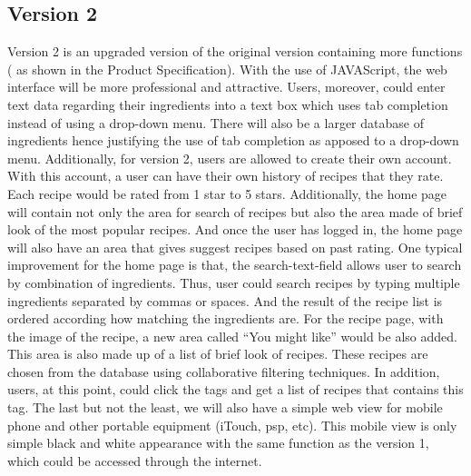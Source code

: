 \documentclass[12pt]{article}
\begin{document}
\subsection{Version 2}
Version 2 is an upgraded version of the original version containing more functions ( as shown in the Product Specification). With the use of JAVAScript, the web interface will be more professional and attractive. Users, moreover, could enter text data regarding their ingredients into a text box which uses tab completion instead of using a drop-down menu. There will also be a larger database of ingredients hence justifying the use of tab completion as apposed to a drop-down menu.
Additionally, for version 2, users are allowed to create their own account. With this account, a user can have their own history of recipes that they rate. Each recipe would be rated from 1 star to 5 stars. Additionally, the home page will contain not only the area for search of recipes but also the area made of brief look of the most popular recipes. And once the user has logged in, the home page will also have an area that gives suggest recipes based on past rating. 
One typical improvement for the home page is that, the search-text-field allows user to search by combination of ingredients. Thus, user could search recipes by typing multiple ingredients separated by commas or spaces. And the result of the recipe list is ordered according how matching the ingredients are. 
For the recipe page, with the image of the recipe, a new area called “You might like” would be also added.  This area is also made up of a list of brief look of recipes. These recipes are chosen from the database using collaborative filtering techniques. In addition, users, at this point, could click the tags and get a list of recipes that contains this tag.
The last but not the least, we will also have a simple web view for mobile phone and other portable equipment (iTouch, psp, etc). This mobile view is only simple black and white appearance with the same function as the version 1, which could be accessed through the internet.
\end{document}
